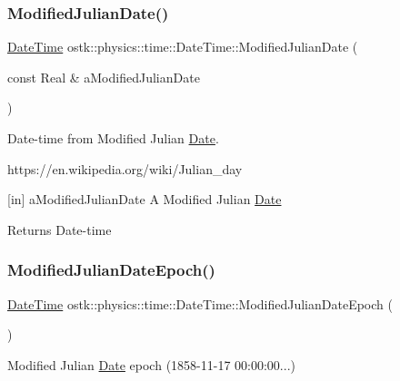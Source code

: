 \subsubsection{\texorpdfstring{Modified\+Julian\+Date()}{ModifiedJulianDate()}}
{\footnotesize\ttfamily \hyperlink{classostk_1_1physics_1_1time_1_1_date_time}{Date\+Time} ostk\+::physics\+::time\+::\+Date\+Time\+::\+Modified\+Julian\+Date (\begin{DoxyParamCaption}\item[{const Real \&}]{a\+Modified\+Julian\+Date }\end{DoxyParamCaption})\hspace{0.3cm}{\ttfamily [static]}}



Date-\/time from Modified Julian \hyperlink{classostk_1_1physics_1_1time_1_1_date}{Date}. 

https\+://en.wikipedia.\+org/wiki/\+Julian\+\_\+day

\mbox{[}in\mbox{]} a\+Modified\+Julian\+Date A Modified Julian \hyperlink{classostk_1_1physics_1_1time_1_1_date}{Date} \begin{DoxyReturn}{Returns}
Date-\/time 
\end{DoxyReturn}
\mbox{\label{classostk_1_1physics_1_1time_1_1_date_time_a21b33a253f185060eb898f6d7d760706}} 
\subsubsection{\texorpdfstring{Modified\+Julian\+Date\+Epoch()}{ModifiedJulianDateEpoch()}}
{\footnotesize\ttfamily \hyperlink{classostk_1_1physics_1_1time_1_1_date_time}{Date\+Time} ostk\+::physics\+::time\+::\+Date\+Time\+::\+Modified\+Julian\+Date\+Epoch (\begin{DoxyParamCaption}{ }\end{DoxyParamCaption})\hspace{0.3cm}{\ttfamily [static]}}



Modified Julian \hyperlink{classostk_1_1physics_1_1time_1_1_date}{Date} epoch (1858-\/11-\/17 00\+:00\+:00...) 

